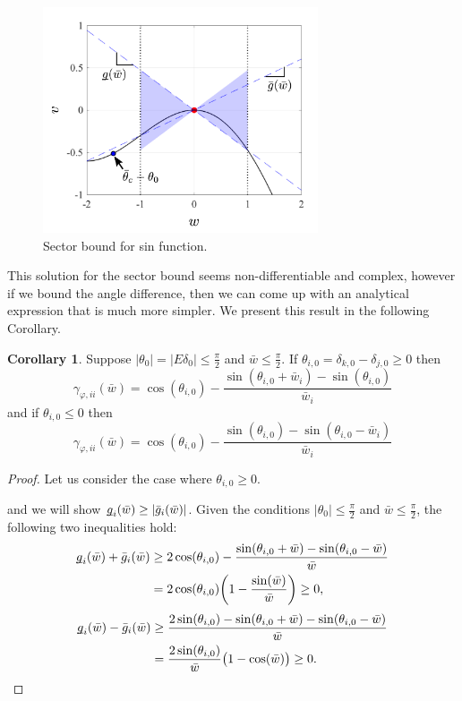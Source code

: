 \documentclass[journal]{IEEEtran}
\theoremstyle{definition}
\newtheorem{corollary}{Corollary}
\begin{document}
\begin{figure}[!htbp]
	\centering
	\includegraphics[width=3.2in]{picture/sector_bound_vw.png}
	\caption{Sector bound for sin function.}
	\label{fig_sector_bound_vw}
\end{figure}


This solution for the sector bound seems non-differentiable and complex, however if we bound the angle difference, then we can come up with an analytical expression that is much more simpler. We present this result in the following Corollary.

\begin{corollary}
Suppose $|\theta_0|=|E\delta_0|\leq\frac{\pi}{2}$ and $\bar{w}\leq\frac{\pi}{2}$. If $\theta_{i,0}=\delta_{k,0}-\delta_{j,0}\geq0$ then 
\begin{equation}
\gamma_{\varphi,ii}(\bar{w})=\cos(\theta_{i,0})-\frac{\sin(\theta_{i,0}+\bar{w}_i)-\sin(\theta_{i,0})}{\bar{w}_i}
\end{equation}
and if $\theta_{i,0}\leq0$ then 
\begin{equation}
\gamma_{\varphi,ii}(\bar{w})=\cos(\theta_{i,0})-\frac{\sin(\theta_{i,0})-\sin(\theta_{i,0}-\bar{w}_i)}{\bar{w}_i}
\end{equation}
\label{corollary_phigain}
\end{corollary}
\begin{proof}
Let us consider the case where $\theta_{i,0}\geq0$. 

and we will show $\underbar{$g$}_i(\bar{w})\geq|\bar{g}_i(\bar{w})|$. Given the conditions $|\theta_0|\leq\frac{\pi}{2}$ and $\bar{w}\leq\frac{\pi}{2}$, the following two inequalities hold:
$$\begin{aligned}
\underbar{$g$}_i(\bar{w})+\bar{g}_i(\bar{w}) &\geq 2\cos(\theta_{i,0})-\frac{\sin(\theta_{i,0}+\bar{w})-\sin(\theta_{i,0}-\bar{w})}{\bar{w}} \\
&=2\cos(\theta_{i,0})\bigg(1-\frac{\sin(\bar{w})}{\bar{w}}\bigg)\geq0,
\end{aligned}$$
$$\begin{aligned}
\underbar{$g$}_i(\bar{w})-\bar{g}_i(\bar{w}) &\geq \frac{2\sin(\theta_{i,0})-\sin(\theta_{i,0}+\bar{w})-\sin(\theta_{i,0}-\bar{w})}{\bar{w}} \\
&=\frac{2\sin(\theta_{i,0})}{\bar{w}}\big(1-\cos(\bar{w})\big)\geq0.
\end{aligned}$$
\end{proof}
\end{document}
